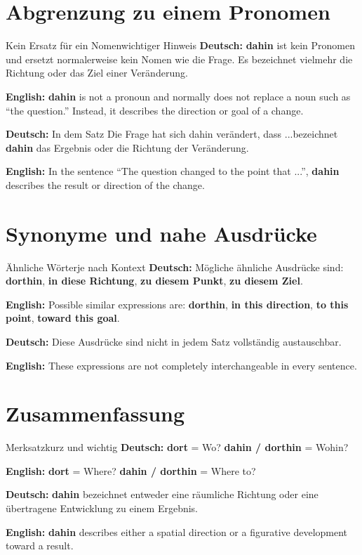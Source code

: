 \documentclass[a4paper,11pt]{article}
\newcommand{\GermanText}[1]{\textbf{Deutsch: }#1\par}
\newcommand{\EnglishText}[1]{{\small\color{SoftGray}\textbf{English: }#1\par}}
\begin{document}
    
    \section{Abgrenzung zu einem Pronomen}
        
        \begin{grammarentry}{Kein Ersatz für ein Nomen}{wichtiger Hinweis}
            \GermanText{\textbf{dahin} ist kein Pronomen und ersetzt normalerweise kein Nomen wie \glqq die Frage\grqq. Es bezeichnet vielmehr die Richtung oder das Ziel einer Veränderung.}
            \EnglishText{\textbf{dahin} is not a pronoun and normally does not replace a noun such as ``the question.'' Instead, it describes the direction or goal of a change.}
            
            \GermanText{In dem Satz \glqq Die Frage hat sich dahin verändert, dass ...\grqq bezeichnet \textbf{dahin} das Ergebnis oder die Richtung der Veränderung.}
            \EnglishText{In the sentence ``The question changed to the point that ...'', \textbf{dahin} describes the result or direction of the change.}
        \end{grammarentry}
    
    
    \section{Synonyme und nahe Ausdrücke}
        
        \begin{grammarentry}{Ähnliche Wörter}{je nach Kontext}
            \GermanText{Mögliche ähnliche Ausdrücke sind: \textbf{dorthin}, \textbf{in diese Richtung}, \textbf{zu diesem Punkt}, \textbf{zu diesem Ziel}.}
            \EnglishText{Possible similar expressions are: \textbf{dorthin}, \textbf{in this direction}, \textbf{to this point}, \textbf{toward this goal}.}
            
            \GermanText{Diese Ausdrücke sind nicht in jedem Satz vollständig austauschbar.}
            \EnglishText{These expressions are not completely interchangeable in every sentence.}
        \end{grammarentry}
    
    
    \section{Zusammenfassung}
        
        \begin{grammarentry}{Merksatz}{kurz und wichtig}
            \GermanText{\textbf{dort} = Wo? \quad \textbf{dahin / dorthin} = Wohin?}
            \EnglishText{\textbf{dort} = Where? \quad \textbf{dahin / dorthin} = Where to?}
            
            \GermanText{\textbf{dahin} bezeichnet entweder eine räumliche Richtung oder eine übertragene Entwicklung zu einem Ergebnis.}
            \EnglishText{\textbf{dahin} describes either a spatial direction or a figurative development toward a result.}
        \end{grammarentry}
\end{document}
